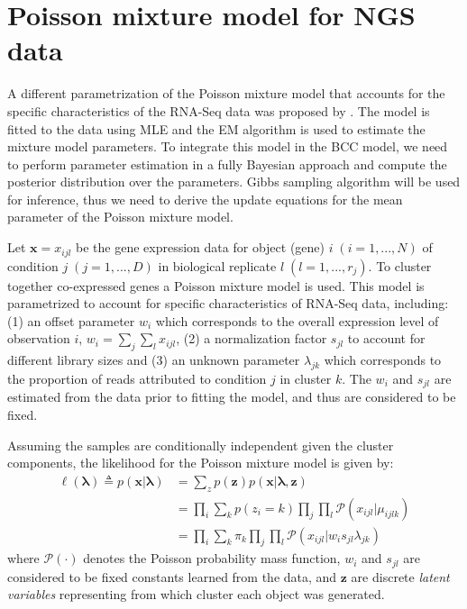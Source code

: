\chapter{Poisson mixture model for NGS data} \label{app-poisson}
A different parametrization of the Poisson mixture model that accounts for the specific characteristics of the RNA-Seq data was proposed by \citet{Rau2013}. The model is fitted to the data using MLE and the EM algorithm is used to estimate the mixture model parameters. To integrate this model in the BCC model, we need to perform parameter estimation in a fully Bayesian approach and compute the posterior distribution over the parameters. Gibbs sampling algorithm will be used for inference, thus we need to derive the update equations for the mean parameter of the Poisson mixture model.

Let $\mathbf{x}=x_{ijl}$ be the gene expression data for object (\ie gene) $i \;(i = 1,...,N)$ of condition $j \; (j=1,...,D)$ in biological replicate $l \; (l=1,...,r_{j})$. To cluster together co-expressed genes a Poisson mixture model is used. This model is parametrized to account for specific characteristics of RNA-Seq data, including:
(1) an offset parameter $w_{i}$ which corresponds to the overall expression level of observation $i$, \ie $w_{i} = \sum\limits_{j}\sum\limits_{l} x_{ijl}$, (2) a normalization factor $s_{jl}$ to account for different library sizes and (3) an unknown parameter $\lambda_{jk}$ which corresponds to the proportion of reads attributed to condition $j$ in cluster $k$. The $w_{i}$ and $s_{jl}$ are estimated from the data prior to fitting the model, and thus are considered to be fixed.

Assuming the samples are conditionally independent given the cluster components, the likelihood for the Poisson mixture model is given by:
\begin{equation} \label{poisson-log-lin-mm-app}
  \begin{split}
	\ell(\mathbf{\lambda}) \triangleq p(\mathbf{x} | \mathbf{\lambda}) & = \sum\limits_{z} p(\mathbf{z}) p(\mathbf{x} | \mathbf{\lambda}, \mathbf{z})\\
		& = \prod_{i} \sum_{k} p(z_{i} = k) \prod_{j} \prod_{l} \mathcal{P}(x_{ijl} | \mu_{ijlk}) \\
		& = \prod_{i} \sum_{k} \pi_{k} \prod_{j} \prod_{l} \mathcal{P}(x_{ijl} | w_{i}s_{jl} \lambda_{jk})
  \end{split}
\end{equation}
where $\mathcal{P}(\cdot)$ denotes the Poisson probability mass function, $w_{i}$ and $s_{jl}$ are considered to be fixed constants learned from the data, and $\mathbf{z}$ are discrete \emph{latent variables} representing from which cluster each object was generated. 

